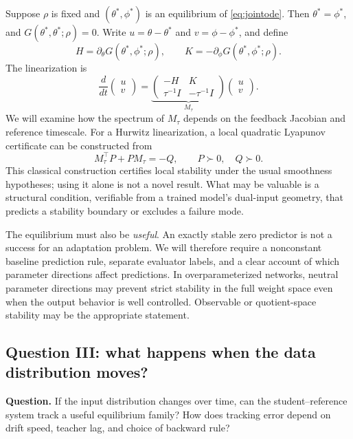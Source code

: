 \documentclass[11pt,a4paper]{article}
\begin{document}
Suppose $\rho$ is fixed and $(\theta^*,\phi^*)$ is an equilibrium of \eqref{eq:jointode}. Then $\theta^*=\phi^*$, and $G(\theta^*,\theta^*;\rho)=0$. Write $u=\theta-\theta^*$ and $v=\phi-\phi^*$, and define
\begin{equation}
H=\partial_\theta G(\theta^*,\phi^*;\rho),\qquad
K=-\partial_\phi G(\theta^*,\phi^*;\rho).
\end{equation}
The linearization is
\begin{equation}
\frac{d}{dt}\begin{pmatrix}u\\v\end{pmatrix}
=\underbrace{\begin{pmatrix}-H&K\\ \tau^{-1}I&-\tau^{-1}I\end{pmatrix}}_{M_\tau}
\begin{pmatrix}u\\v\end{pmatrix}.
\label{eq:blockM}
\end{equation}
We will examine how the spectrum of $M_\tau$ depends on the feedback Jacobian and reference timescale. For a Hurwitz linearization, a local quadratic Lyapunov certificate can be constructed from
\begin{equation}
M_\tau^\top P+PM_\tau=-Q,\qquad P\succ0,\quad Q\succ0.
\label{eq:lyapeq}
\end{equation}
This classical construction certifies local stability under the usual smoothness hypotheses; using it alone is not a novel result. What may be valuable is a structural condition, verifiable from a trained model's dual-input geometry, that predicts a stability boundary or excludes a failure mode.

The equilibrium must also be \emph{useful}. An exactly stable zero predictor is not a success for an adaptation problem. We will therefore require a nonconstant baseline prediction rule, separate evaluator labels, and a clear account of which parameter directions affect predictions. In overparameterized networks, neutral parameter directions may prevent strict stability in the full weight space even when the output behavior is well controlled. Observable or quotient-space stability may be the appropriate statement.

\subsection{Question III: what happens when the data distribution moves?}
\textbf{Question.} If the input distribution changes over time, can the student--reference system track a useful equilibrium family? How does tracking error depend on drift speed, teacher lag, and choice of backward rule?
\end{document}
